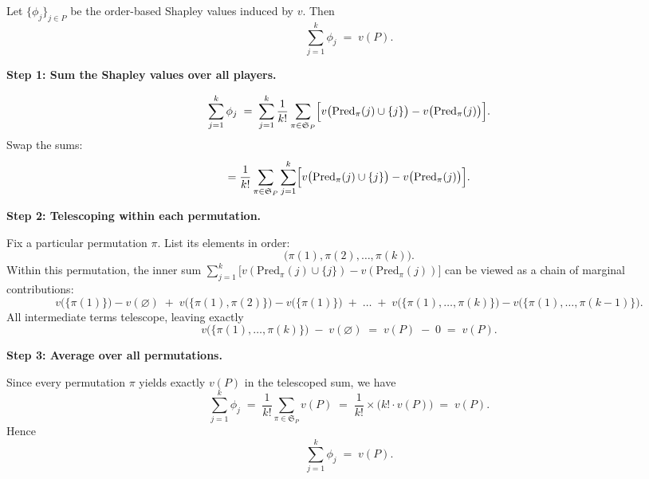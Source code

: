 \documentclass{article}
\begin{document}
\begin{theorem}[Efficiency]
Let $\{\phi_j\}_{j \in P}$ be the order-based Shapley values induced by $v$. Then
\[
\sum_{j=1}^k \phi_j
\;=\;
v(P).
\]
\end{theorem}

\begin{proofsketch}
\noindent
\textbf{Step 1: Sum the Shapley values over all players.}

\[
\sum_{j=1}^k \phi_j 
\;=\;
\sum_{j=1}^k
\frac{1}{k!}
\sum_{\pi \in \mathfrak{S}_P}
\Bigl[v\bigl(\mathrm{Pred}_\pi(j)\cup\{j\}\bigr)
- 
v\bigl(\mathrm{Pred}_\pi(j)\bigr)\Bigr].
\]
Swap the sums:
\[
=
\frac{1}{k!}
\sum_{\pi \in \mathfrak{S}_P}
\sum_{j=1}^k
\Bigl[v\bigl(\mathrm{Pred}_\pi(j)\cup\{j\}\bigr)
- 
v\bigl(\mathrm{Pred}_\pi(j)\bigr)\Bigr].
\]

\medskip
\noindent
\textbf{Step 2: Telescoping within each permutation.}

Fix a particular permutation $\pi$.  List its elements in order:
\[
\bigl(\pi(1), \pi(2), \dots, \pi(k)\bigr).
\]
Within this permutation, the inner sum
\(\sum_{j=1}^k
\bigl[v(\mathrm{Pred}_\pi(j)\cup\{j\}) - v(\mathrm{Pred}_\pi(j))\bigr]\)
can be viewed as a chain of marginal contributions:
\[
v\bigl(\{\pi(1)\}\bigr) - v(\varnothing)
\;+\;
v\bigl(\{\pi(1), \pi(2)\}\bigr) - v\bigl(\{\pi(1)\}\bigr)
\;+\;\dots\;+\;
v\bigl(\{\pi(1),\ldots,\pi(k)\}\bigr) - v\bigl(\{\pi(1),\ldots,\pi(k-1)\}\bigr).
\]
All intermediate terms telescope, leaving exactly
\[
v\bigl(\{\pi(1),\ldots,\pi(k)\}\bigr)
\;-\;
v(\varnothing)
\;=\;
v(P)
\;-\;
0
\;=\;
v(P).
\]

\medskip
\noindent
\textbf{Step 3: Average over all permutations.}

Since every permutation $\pi$ yields exactly $v(P)$ in the telescoped sum, we have
\[
\sum_{j=1}^k \phi_j
\;=\;
\frac{1}{k!}
\sum_{\pi \in \mathfrak{S}_P} 
v(P)
\;=\;
\frac{1}{k!} \times \bigl(k! \cdot v(P)\bigr)
\;=\;
v(P).
\]
Hence
\[
\sum_{j=1}^k \phi_j 
\;=\;
v(P).
\]
\end{proofsketch}
\end{document}
